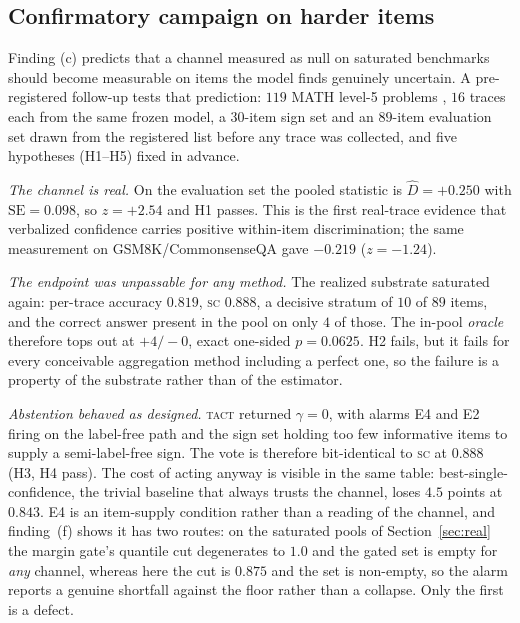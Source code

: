 \documentclass{article}
\newcommand{\Dhat}{\widehat{D}}
\newcommand{\SC}{\textsc{sc}}
\newcommand{\TACT}{\textsc{tact}}
\begin{document}
\subsection{Confirmatory campaign on harder items}\label{sec:hard}
Finding (c) predicts that a channel measured as null on saturated benchmarks
should become measurable on items the model finds genuinely uncertain. A
pre-registered follow-up tests that prediction: $119$ MATH level-5 problems
\citep{math500,lightman2024verify}, $16$ traces each from the same frozen
model, a $30$-item sign set and an $89$-item evaluation set drawn from the
registered list before any trace was collected, and five hypotheses (H1--H5)
fixed in advance.

\emph{The channel is real.} On the evaluation set the pooled statistic is
$\Dhat=+0.250$ with $\mathrm{SE}=0.098$, so $z=+2.54$ and H1 passes. This is
the first real-trace evidence that verbalized confidence carries positive
within-item discrimination; the same measurement on GSM8K/CommonsenseQA gave
$-0.219$ ($z=-1.24$).

\emph{The endpoint was unpassable for any method.} The realized substrate
saturated again: per-trace accuracy $0.819$, \SC{} $0.888$, a decisive
stratum of $10$ of $89$ items, and the correct answer present in the pool on
only $4$ of those. The in-pool \emph{oracle} therefore tops out at $+4/-0$,
exact one-sided $p=0.0625$. H2 fails, but it fails for every conceivable
aggregation method including a perfect one, so the failure is a property of
the substrate rather than of the estimator.

\emph{Abstention behaved as designed.} \TACT{} returned $\gamma=0$, with
alarms E4 and E2 firing on the label-free path and the sign set holding too
few informative items to supply a semi-label-free sign. The vote is therefore
bit-identical to \SC{} at $0.888$ (H3, H4 pass). The cost of acting anyway is
visible in the same table: best-single-confidence, the trivial baseline that
always trusts the channel, loses $4.5$ points at $0.843$. E4 is an
item-supply condition rather than a reading of the channel, and finding~(f)
shows it has two routes: on the saturated pools of Section~\ref{sec:real} the
margin gate's quantile cut degenerates to $1.0$ and the gated set is empty for
\emph{any} channel, whereas here the cut is $0.875$ and the set is non-empty,
so the alarm reports a genuine shortfall against the floor rather than a
collapse. Only the first is a defect.
\end{document}
